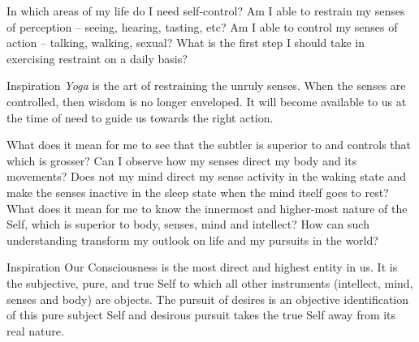 \newpage
\begin{mananam}{} 
\mananamtext In which areas of my life do I need self-control? Am I able to restrain my senses of perception – seeing, hearing, tasting, etc? Am I able to control my senses of action – talking, walking, sexual? What is the first step I should take in exercising restraint on a daily basis?
\end{mananam}
\WritingHand{}
\begin{inspiration}{\mananamfont Inspiration}
\mananamtext \emph{Yoga} is the art of restraining the unruly senses. When the senses are controlled, then wisdom is no longer enveloped. It will become available to us at the time of need to guide us towards the right action. 
\end{inspiration}
\newpage



\newpage
\begin{mananam}{} 
\mananamtext What does it mean for me to see that the subtler is superior to and controls that which is grosser? Can I observe how my senses direct my body and its movements? Does not my mind direct my sense activity in the waking state and make the senses inactive in the sleep state when the mind itself goes to rest? 
What does it mean for me to know the innermost and higher-most nature of the Self, which is superior to body, senses, mind and intellect? How can such understanding transform my outlook on life and my pursuits in the world?
\end{mananam}
\WritingHand{}
\begin{inspiration}{\mananamfont Inspiration}
\mananamtext Our Consciousness is the most direct and highest entity in us. It is the subjective, pure, and true Self to which all other instruments (intellect, mind, senses and body) are objects. The pursuit of desires is an objective identification of this pure subject Self and desirous pursuit takes the true Self away from its real nature.
\end{inspiration}
\newpage

